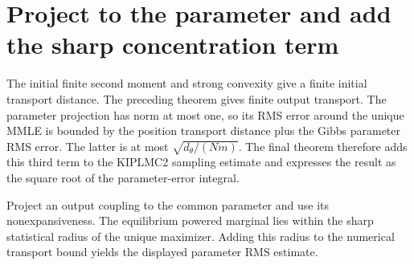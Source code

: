 \documentclass[11pt,a4paper]{article}
\begin{document}
\section{\texorpdfstring{Project to the parameter and add the sharp concentration term}{Project to the parameter and add the sharp concentration term}}


The initial finite second moment and strong convexity give a finite initial transport distance. The preceding theorem gives finite output transport. The parameter projection has norm at most one, so its RMS error around the unique MMLE is bounded by the position transport distance plus the Gibbs parameter RMS error. The latter is at most \(\sqrt{d_\theta/(Nm)}\). The final theorem therefore adds this third term to the KIPLMC2 sampling estimate and expresses the result as the square root of the parameter-error integral.



Project an output coupling to the common parameter and use its nonexpansiveness. The equilibrium powered marginal lies within the sharp statistical radius of the unique maximizer. Adding this radius to the numerical transport bound yields the displayed parameter RMS estimate.
\end{document}
